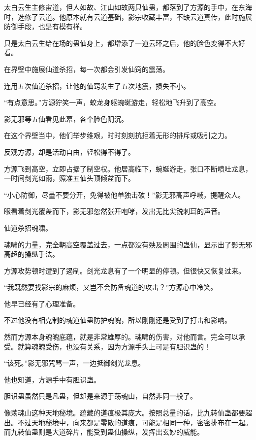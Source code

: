
\begin{this_body}

太白云生主修宙道，但人如故、江山如故两只仙蛊，都落到了方源的手中，在东海时，选修了云道。他原本就有云道基础，影宗收藏丰富，不缺云道真传，此时施展防御手段，也是有模有样。

只是太白云生给在场的蛊仙身上，都增添了一道云环之后，他的脸色变得不大好看。

在界壁中施展仙道杀招，每一次都会引发仙窍的震荡。

连用五次仙道杀招，让他的仙窍发生了五次地震，损失不小。

“有点意思。”方源狞笑一声，蛟龙身躯蜿蜒游走，轻松地飞升到了高空。

影无邪等五仙看见此幕，各个脸色阴沉。

在这个界壁当中，他们举步维艰，时时刻刻抗拒着无形的排斥或吸引之力。

反观方源，却是活动自由，轻松得不得了。

方源飞到高空，立即占据了制空权。他居高临下，蜿蜒游走，张口不断喷吐龙息，一时间剑光如雨，照准五仙头顶倾盆而下。

“小心防御，尽量不要分开，免得被他单独击破！”影无邪高声呼喊，提醒众人。

眼看着剑光覆盖而下，影无邪忽然张开咆哮，发出无比尖锐刺耳的声音。

仙道杀招魂啸。

魂啸的力量，完全朝高空覆盖过去，一点都没有殃及周围的蛊仙，显示出了影无邪高超的操纵手法。

方源攻势顿时遭到了遏制。剑光龙息有了一个明显的停顿。但很快又恢复过来。

“我既然要找影宗的麻烦，又岂不会防备魂道的攻击？”方源心中冷笑。

他早已经有了心理准备。

不过他没有相克制的魂道仙蛊防护魂魄，所以刚刚还是受到了打击和影响。

然而方源本身魂魄底蕴，就是非常雄厚的。魂啸的伤害，对他而言。完全可以承受。就算魂魄受伤，也没有关系，因为方源手头上可是有胆识蛊的！

“该死。”影无邪咒骂一声，一边抵御剑光龙息。

他也知道，方源手中有胆识蛊。

胆识蛊虽然只是凡蛊，但却是来源于荡魂山，自然非同一般了。

像荡魂山这种天地秘境。蕴藏的道痕极其庞大。按照总量的话，比九转仙蛊都要超出。不过天地秘境中，向来都是零散的道痕，可能是相同一种，密密排布在一起。而九转仙蛊则是大道碎片，能受到蛊仙操纵，发挥出玄妙的威能。


\end{this_body}

